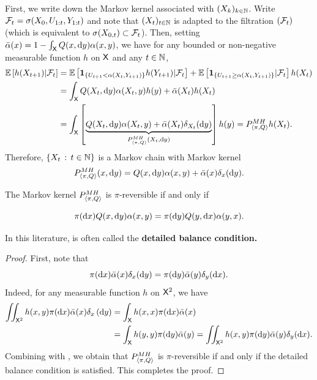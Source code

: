 \documentclass[english,graybox,envcountchap,envcountsame,sectrefs,shortlabels]{svmono}
\theoremstyle{style}
\newenvironment{svmultproof}{\small \begin{proof}}{\end{proof}}
\newcommand{\bs}{\begin{shaded}}
\newcommand{\es}{\end{shaded}}
\begin{document}
First, we write down the Markov kernel associated with $(X_{k})_{k\in\mathbb{N}}$. Write $\mathcal{F}_{t}=\sigma(X_{0},U_{1:t},Y_{1:t})$
and note that $(X_{t})_{t\in\mathbb{N}}$ is adapted to the filtration $(\mathcal{F}_{t})$
(which is equivalent to $\sigma(X_{0,t})\subset\mathcal{F}_{t}$). Then,
setting $\bar{\alpha}(x)=1-\int_{\mathsf{X}}Q(x,\mathrm{d} y)\alpha(x,y)$, we
have for any bounded or non-negative measurable function $h$ on $\mathsf{X}$
and any $t\in\mathbb{N}$,
\begin{align*}
\mathbb{E}\left[h(X_{t+1})|\mathcal{F}_{t}\right] & =\mathbb{E}\left[\mathbf{1}_{\left\{ U_{t+1}<\alpha(X_{t},Y_{t+1})\right\} }h(Y_{t+1})|\mathcal{F}_{t}\right]+\mathbb{E}\left[\mathbf{1}_{\left\{ U_{t+1}\geq\alpha(X_{t},Y_{t+1})\right\} }|\mathcal{F}_{t}\right]h(X_{t})\\
 & =\int_{\mathsf{X}}Q(X_{t},\mathrm{d} y)\alpha(X_{t},y)h(y)+\bar{\alpha}(X_{t})h(X_{t})\\
 & =\int_{\mathsf{X}}\left[\underbrace{Q(X_{t},\mathrm{d} y)\alpha(X_{t},y)+\bar{\alpha}(X_{t})\delta_{X_{t}}(\mathrm{d} y)}_{P_{\langle\pi,Q\rangle}^{MH}(X_{t},\mathrm{d} y)}\right]h(y)=P_{\langle\pi,Q\rangle}^{MH}h(X_{t}).
\end{align*}
Therefore, $\left\{ X_{t}\,:\,t\in\mathbb{N}\right\}$ is a Markov chain with Markov
kernel
\begin{equation}
P_{\langle\pi,Q\rangle}^{MH}(x,\mathrm{d} y)=Q(x,\mathrm{d} y)\alpha(x,y)+\bar{\alpha}(x)\delta_{x}(\mathrm{d} y).\label{eq:def:mh}
\end{equation}
 \bs
\begin{lemma}
\label{lem:reversible} The Markov kernel $P_{\langle\pi,Q\rangle}^{MH}$ is $\pi$-reversible
if and only if

\begin{equation}
\pi(\mathrm{d} x)Q(x,\mathrm{d} y)\alpha(x,y)=\pi(\mathrm{d} y)Q(y,\mathrm{d} x)\alpha(y,x).\label{eq:balance:detaillee}
\end{equation}
\end{lemma}
\es In this literature,  is often called
the \textbf{detailed balance condition.}
\begin{svmultproof}
First, note that
\begin{equation}
\pi(\mathrm{d} x)\bar{\alpha}(x)\delta_{x}(\mathrm{d} y)=\pi(\mathrm{d} y)\bar{\alpha}(y)\delta_{y}(\mathrm{d} x).\label{eq:balance:dirac}
\end{equation}
Indeed, for any measurable function $h$ on $\mathsf{X}^{2}$, we have
\begin{align*}
\iint_{\mathsf{X}^{2}}h(x,y)\pi(\mathrm{d} x)\bar{\alpha}(x)\delta_{x}\left(\mathrm{d} y\right) & =\int_{\mathsf{X}}h(x,x)\pi(\mathrm{d} x)\bar{\alpha}(x)\\
 & =\int_{\mathsf{X}}h(y,y)\pi(\mathrm{d} y)\bar{\alpha}(y)=\iint_{\mathsf{X}^{2}}h(x,y)\pi(\mathrm{d} y)\bar{\alpha}(y)\delta_{y}(\mathrm{d} x).
\end{align*}
Combining  with , we obtain that
$P_{\langle\pi,Q\rangle}^{MH}$ is $\pi$-reversible if and only if the detailed balance
condition  is satisfied. This completes
the proof.
\end{svmultproof}
\end{document}
